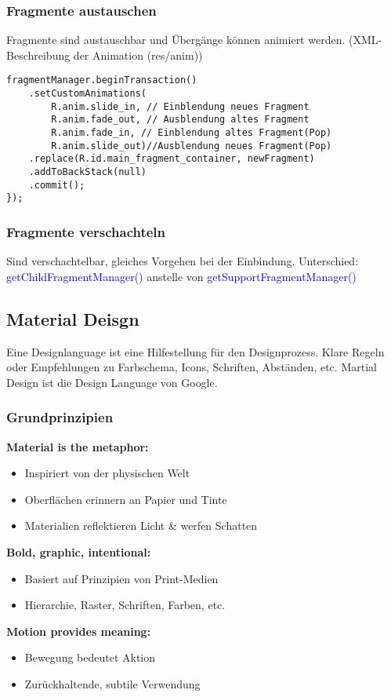 \subsubsection{Fragmente austauschen}
Fragmente sind austauschbar und Übergänge können animiert werden. (XML-Beschreibung der Animation (res/anim))
\begin{lstlisting}
fragmentManager.beginTransaction()
    .setCustomAnimations(
        R.anim.slide_in, // Einblendung neues Fragment
        R.anim.fade_out, // Ausblendung altes Fragment
        R.anim.fade_in, // Einblendung altes Fragment(Pop)
        R.anim.slide_out)//Ausblendung neues Fragment(Pop)
    .replace(R.id.main_fragment_container, newFragment)
    .addToBackStack(null)
    .commit();
});
\end{lstlisting}
\subsubsection{Fragmente verschachteln}
Sind verschachtelbar, gleiches Vorgehen bei der Einbindung. Unterschied: \textcolor{blue}{getChildFragmentManager()} anstelle von \textcolor{blue}{getSupportFragmentManager()}
\subsection{Material Deisgn}
Eine Designlanguage ist eine Hilfestellung für den Designprozess. Klare Regeln oder Empfehlungen zu Farbschema, Icons, Schriften, Abständen, etc. Martial Design ist die Design Language von Google.
\subsubsection{Grundprinzipien}
\textbf{Material is the metaphor:}
\begin{itemize}[topsep=0pt, leftmargin=4mm]
    \setlength\itemsep{-0.3em}
    \item Inspiriert von der physischen Welt
    \item Oberflächen erinnern an Papier und Tinte
    \item Materialien reflektieren Licht \& werfen Schatten
\end{itemize}
\textbf{Bold, graphic, intentional:}
\begin{itemize}[topsep=0pt, leftmargin=4mm]
    \setlength\itemsep{-0.3em}
    \item Basiert auf Prinzipien von Print-Medien
    \item Hierarchie, Raster, Schriften, Farben, etc.
\end{itemize}
\textbf{Motion provides meaning:}
\begin{itemize}[topsep=0pt, leftmargin=4mm]
    \setlength\itemsep{-0.3em}
    \item Bewegung bedeutet Aktion
    \item Zurückhaltende, subtile Verwendung
\end{itemize}
